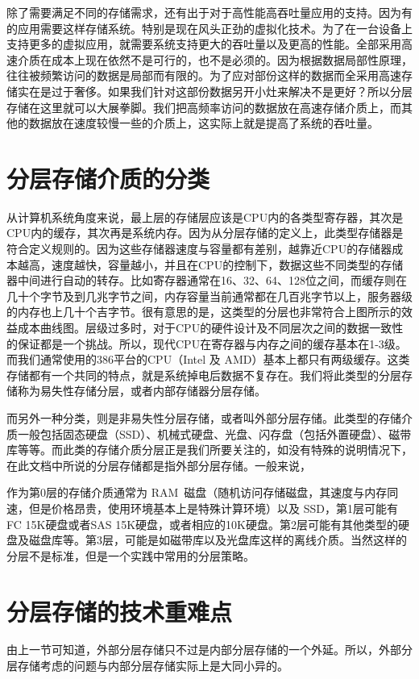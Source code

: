 除了需要满足不同的存储需求，还有出于对于高性能高吞吐量应用的支持。因为有的应用需要这样存储系统。特别是现在风头正劲的虚拟化技术。为了在一台设备上支持更多的虚拟应用，就需要系统支持更大的吞吐量以及更高的性能。全部采用高速介质在成本上现在依然不是可行的，也不是必须的。因为根据数据局部性原理，往往被频繁访问的数据是局部而有限的。为了应对部份这样的数据而全采用高速存储实在是过于奢侈。如果我们针对这部份数据另开小灶来解决不是更好？所以分层存储在这里就可以大展拳脚。我们把高频率访问的数据放在高速存储介质上，而其他的数据放在速度较慢一些的介质上，这实际上就是提高了系统的吞吐量。

\section{分层存储介质的分类}
从计算机系统角度来说，最上层的存储层应该是CPU内的各类型寄存器，其次是CPU内的缓存，其次再是系统内存。因为从分层存储的定义上，此类型存储器是符合定义规则的。因为这些存储器速度与容量都有差别，越靠近CPU的存储器成本越高，速度越快，容量越小，并且在CPU的控制下，数据这些不同类型的存储器中间进行自动的转存。比如寄存器通常在16、32、64、128位之间，而缓存则在几十个字节及到几兆字节之间，内存容量当前通常都在几百兆字节以上，服务器级的内存也上几十个吉字节。很有意思的是，这类型的分层也非常符合上图所示的效益成本曲线图。层级过多时，对于CPU的硬件设计及不同层次之间的数据一致性的保证都是一个挑战。所以，现代CPU在寄存器与内存之间的缓存基本在1-3级。而我们通常使用的386平台的CPU（Intel 及 AMD）基本上都只有两级缓存。这类存储都有一个共同的特点，就是系统掉电后数据不复存在。我们将此类型的分层存储称为易失性存储分层，或者内部存储器分层存储。

而另外一种分类，则是非易失性分层存储，或者叫外部分层存储。此类型的存储介质一般包括固态硬盘（SSD）、机械式硬盘、光盘、闪存盘（包括外置硬盘）、磁带库等等。而此类的存储介质分层正是我们所要关注的，如没有特殊的说明情况下，在此文档中所说的分层存储都是指外部分层存储。一般来说，

作为第0层的存储介质通常为 RAM 磁盘（随机访问存储磁盘，其速度与内存同速，但是价格昂贵，使用环境基本上是特殊计算环境）以及 SSD，第1层可能有 FC 15K硬盘或者SAS 15K硬盘，或者相应的10K硬盘。第2层可能有其他类型的硬盘及磁盘库等。第3层，可能是如磁带库以及光盘库这样的离线介质。当然这样的分层不是标准，但是一个实践中常用的分层策略。

\section{分层存储的技术重难点}
由上一节可知道，外部分层存储只不过是内部分层存储的一个外延。所以，外部分层存储考虑的问题与内部分层存储实际上是大同小异的。

